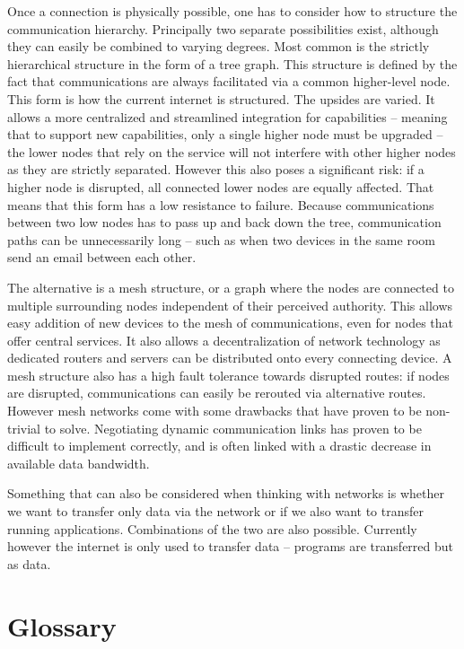 \documentclass{acm_proc_article-sp}
\begin{document}
Once a connection is physically possible, one has to consider how to structure the communication hierarchy.
Principally two separate possibilities exist, although they can easily be combined to varying degrees.
Most common is the strictly hierarchical structure in the form of a tree graph.
This structure is defined by the fact that communications are always facilitated via a common higher-level node.
This form is how the current internet is structured.
The upsides are varied.
It allows a more centralized and streamlined integration for capabilities – meaning that to support new capabilities, only a single higher node must be upgraded – the lower nodes that rely on the service will not interfere with other higher nodes as they are strictly separated.
However this also poses a significant risk: if a higher node is disrupted, all connected lower nodes are equally affected.
That means that this form has a low resistance to failure.
Because communications between two low nodes has to pass up and back down the tree, communication paths can be unnecessarily long – such as when two devices in the same room send an email between each other.

The alternative is a mesh structure, or a graph where the nodes are connected to multiple surrounding nodes independent of their perceived authority.
This allows easy addition of new devices to the mesh of communications, even for nodes that offer central services.
It also allows a decentralization of network technology as dedicated routers and servers can be distributed onto every connecting device.
A mesh structure also has a high fault tolerance towards disrupted routes: if nodes are disrupted, communications can easily be rerouted via alternative routes.
However mesh networks come with some drawbacks that have proven to be non-trivial to solve.
Negotiating dynamic communication links has proven to be difficult to implement correctly, and is often linked with a drastic decrease in available data bandwidth.

Something that can also be considered when thinking with networks is whether we want to transfer only data via the network or if we also want to transfer running applications.
Combinations of the two are also possible.
Currently however the internet is only used to transfer data – programs are transferred but as data.

\section{Glossary}


\balancecolumns
\end{document}
